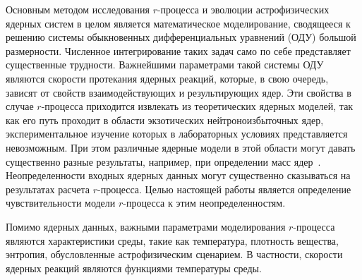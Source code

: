 Основным методом исследования $r$-процесса и эволюции астрофизических ядерных систем в целом является математическое моделирование, сводящееся к решению системы обыкновенных дифференциальных уравнений (ОДУ) большой размерности. Численное интегрирование таких задач само по себе представляет существенные трудности. Важнейшими параметрами такой системы ОДУ являются скорости протекания ядерных реакций, которые, в свою очередь, зависят от свойств взаимодействующих и результирующих ядер. Эти свойства в случае $r$-процесса приходится извлекать из теоретических ядерных моделей, так как его путь проходит в области экзотических нейтроноизбыточных ядер, экспериментальное изучение которых в лабораторных условиях представляется невозможным. При этом различные ядерные модели в этой области могут давать существенно разные результаты, например, при определении масс ядер~\cite{sobiczewski2018}. Неопределенности входных ядерных данных могут существенно сказываться на результатах расчета $r$-процесса. Целью настоящей работы является определение чувствительности модели $r$-процесса к этим неопределенностям.

Помимо ядерных данных, важными параметрами моделирования $r$-процесса являются характеристики среды, такие как температура, плотность вещества, энтропия, обусловленные астрофизическим сценарием. В частности, скорости ядерных реакций являются функциями температуры среды. 
